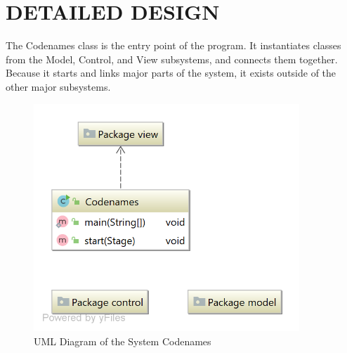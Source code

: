 \section{DETAILED DESIGN}

The Codenames class is the entry point of the program. It instantiates classes from the Model, Control, and View subsystems, and connects them together. Because it starts and links major parts of the system, it exists outside of the other major subsystems.

\begin{figure}[H]
\centering
\includegraphics[width=10cm]{Source/Module/Codenames.png}
\caption{UML Diagram of the System Codenames}
\end{figure}





\newpage